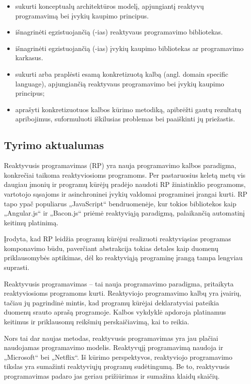 \begin{itemize}
        \item sukurti konceptualų architektūros modelį, apjungiantį reaktyvų programavimą bei įvykių kaupimo principus.
        \item išnagrinėti egzistuojančią (-ias) reaktyvaus programavimo bibliotekas.
        \item išnagrinėti egzistuojančią (-ias) įvykių kaupimo bibliotekas ar programavimo karkasus.
        \item sukurti arba praplėsti esamą konkretizuotą kalbą (angl. domain specific language), apjungiančią reaktyvaus programavimo bei įvykių kaupimo principus;
        \item aprašyti konkretizuotuos kalbos kūrimo metodiką, apibrėžti gautų rezultatų apribojimus, suformuluoti iškilusias problemas bei paaiškinti jų priežastis.
\end{itemize}

\subsection{Tyrimo aktualumas}

Reaktyvusis programavimas (RP) yra nauja programavimo kalbos paradigma, konkrečiai taikoma reaktyviosioms programoms. Per pastaruosius keletą metų vis daugiau įmonių ir programų kūrėjų pradėjo naudoti RP žiniatinklio programoms, vartotojo sąsajoms ir asinchroninei įvykių valdomai programinei įrangai kurti. RP tapo ypač populiarus „JavaScript“ bendruomenėje, kur tokios bibliotekos kaip „Angular.js“ ir „Bacon.js“ priėmė reaktyviąją paradigmą, palaikančią automatinį keitimų platinimą.

Įrodyta, kad RP leidžia programų kūrėjui realizuoti reaktyviąsias programas komponavimo būdu, paverčiant abstrakcija tokias detales kaip duomenų priklausomybės aptikimas, dėl ko reaktyviąją programinę įrangą tampa lengviau suprasti.

Reaktyvusis programavimas – tai nauja programavimo paradigma, pritaikyta reaktyviosioms programoms kurti. Reaktyviojo programavimo kalbų yra įvairių, tačiau jų pagrindinė mintis, kad programų kūrėjai deklaratyviai pateikia duomenų srauto aprašą programoje. Kalbos vykdyklė apdoroja platinamus keitimus ir priklausomų reikšmių perskaičiavimą, kai to reikia.

Nors tai dar naujas metodas, reaktyvusis programavimas yra jau plačiai naudojamas programavimo modelis. Reaktyvųjį programavimą naudoja ir „Microsoft“ bei „Netflix“. Iš kūrimo perspektyvos, reaktyviojo programavimo tikslas yra sumažinti reaktyviųjų programų sudėtingumą. Be to, reaktyvusis programavimas padaro jas geriau prižiūrimas ir sumažina klaidų skaičių.

